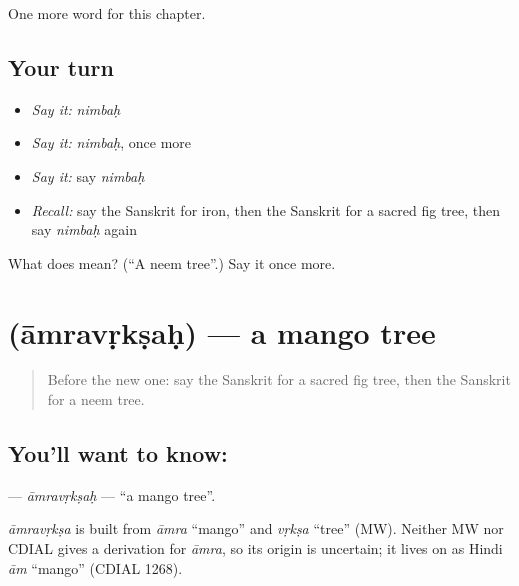 \begin{grammarlens}[title={What you've built}]
One more word for this chapter.
\end{grammarlens}

\subsection*{Your turn}
\begin{itemize}
\raggedright
  \item \emph{Say it:} \emph{nimbaḥ}
  \item \emph{Say it:} \emph{nimbaḥ}, once more
  \item \emph{Say it:} say \emph{nimbaḥ}
  \item \emph{Recall:} say the Sanskrit for iron, then the Sanskrit for a sacred fig tree, then say \emph{nimbaḥ} again
\end{itemize}

\begin{tcolorbox}[breakable,colback=teal!4,colframe=teal!35!black,title={Before you move on}]
What does  mean? (\textquotedblleft{}A neem tree\textquotedblright{}.) Say it once more.
\end{tcolorbox}
\section[\texorpdfstring{\sk{आम्रवृक्षः} (āmravṛkṣaḥ)}{आम्रवृक्षः (āmravṛkṣaḥ)}]{ (āmravṛkṣaḥ) — a mango tree}

\label{lesson:SA-C166-amravrksah}



\begin{quote}
Before the new one: say the Sanskrit for a sacred fig tree, then the Sanskrit for a neem tree.
\end{quote}

\subsection*{You'll want to know: }
\textbf{} — \emph{āmravṛkṣaḥ} — \textquotedblleft{}a mango tree\textquotedblright{}.

\begin{cousinweb}
\emph{āmravṛkṣa} is built from \emph{āmra} \textquotedblleft{}mango\textquotedblright{} and \emph{vṛkṣa} \textquotedblleft{}tree\textquotedblright{} (MW). Neither MW nor CDIAL gives a derivation for \emph{āmra}, so its origin is uncertain; it lives on as Hindi \emph{ām} \textquotedblleft{}mango\textquotedblright{} (CDIAL 1268).
\end{cousinweb}

